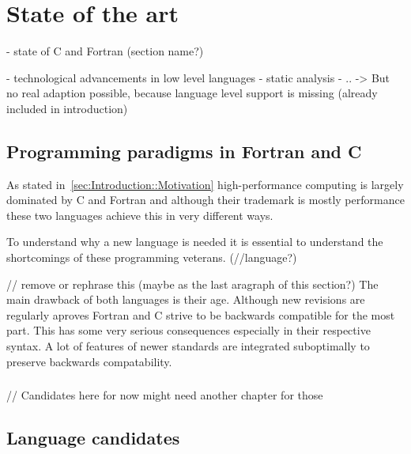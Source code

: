 \chapter{State of the art}
\label{ch:State_of_the_art}


- state of C and Fortran (section name?)

- technological advancements in low level languages
    - static analysis
    - ..
    -> But no real adaption possible, because language level support is missing (already included in introduction)

\section{Programming paradigms in Fortran and C} %
\label{sec:State_of_the_art::Paradigms}

As stated in~\autoref{sec:Introduction::Motivation} high-performance computing is largely dominated by C and Fortran and although their trademark is mostly performance these two languages achieve this in very different ways.


To understand why a new language is needed it is essential to understand the shortcomings of these programming veterans. (//language?)

// remove or rephrase this (maybe as the last aragraph of this section?)
The main drawback of both languages is their age. Although new revisions are regularly aproves Fortran and C strive to be backwards compatible for the most part. This has some very serious consequences especially in their respective syntax. A lot of features of newer standards are integrated suboptimally to preserve backwards compatability.

\subsection*{}

// Candidates here for now might need another chapter for those
\section{Language candidates}
\label{sec:State_of_the_art::Candidates}

